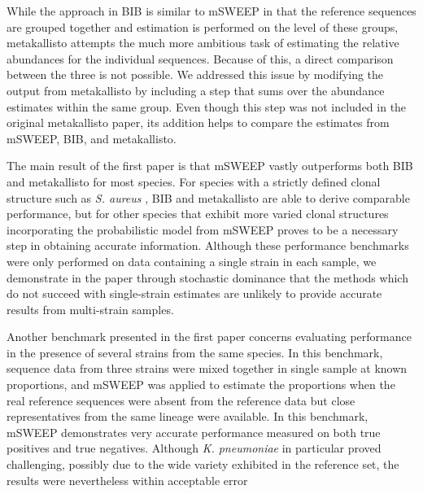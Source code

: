\documentclass[officiallayout]{tktla}
\begin{document}
While the approach in BIB is similar to mSWEEP in that the reference
sequences are grouped together and estimation is performed on the
level of these groups, metakallisto attempts the much more ambitious
task of estimating the relative abundances for the individual
sequences. Because of this, a direct comparison between the three is
not possible. We addressed this issue by modifying the output from
metakallisto by including a step that sums over the abundance
estimates within the same group. Even though this step was not
included in the original metakallisto paper, its addition helps to
compare the estimates from mSWEEP, BIB, and metakallisto.

The main result of the first paper is that mSWEEP vastly outperforms
both BIB and metakallisto for most species. For species with a
strictly defined clonal structure \textemdash such as
\textit{S. aureus} \textemdash, BIB and metakallisto are able to derive
comparable performance, but for other species that exhibit more varied
clonal structures incorporating the probabilistic model from mSWEEP
proves to be a necessary step in obtaining accurate
information. Although these performance benchmarks were only performed
on data containing a single strain in each sample, we demonstrate in
the paper through stochastic dominance that the methods which do not
succeed with single-strain estimates are unlikely to provide accurate
results from multi-strain samples.

Another benchmark presented in the first paper concerns evaluating
performance in the presence of several strains from the same
species. In this benchmark, sequence data from three strains were
mixed together in single sample at known proportions, and mSWEEP was
applied to estimate the proportions when the real reference sequences
were absent from the reference data but close representatives from the
same lineage were available. In this benchmark, mSWEEP demonstrates
very accurate performance measured on both true positives and true
negatives. Although \textit{K. pneumoniae} in particular proved
challenging, possibly due to the wide variety exhibited in the
reference set, the results were nevertheless within acceptable error
\end{document}
